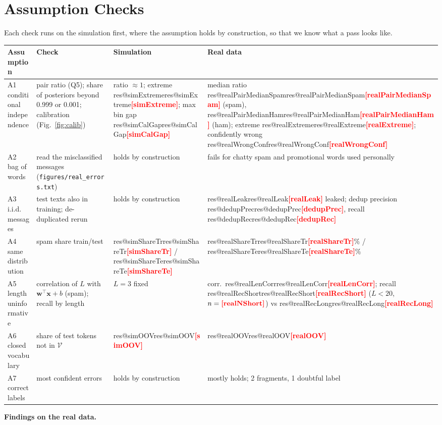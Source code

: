 \documentclass[11pt]{article}
\makeatletter
\newcommand{\fillin}[1]{\textcolor{red}{\textbf{[#1]}}}
\newcommand{\res}[1]{\ifcsname res@#1\endcsname\csname res@#1\endcsname\else\fillin{#1}\fi}
\theoremstyle{plain}
\newcommand{\V}{\mathcal{V}}
\newcommand{\bx}{\mathbf{x}}
\newcommand{\bw}{\mathbf{w}}
\makeatother
\begin{document}
\section{Assumption Checks}\label{sec:assump}
Each check runs on the simulation first, where the assumption holds by construction, so that we know
what a pass looks like.
\begin{center}
\small
\begin{tabularx}{\textwidth}{@{}>{\raggedright\arraybackslash}p{2.6cm}>{\raggedright\arraybackslash}X>{\raggedright\arraybackslash}p{2.5cm}>{\raggedright\arraybackslash}p{3.6cm}@{}}
\toprule
Assumption & Check & Simulation & Real data\\
\midrule
A1 conditional independence & pair ratio (Q5); share of posteriors beyond 0.999 or 0.001; calibration (Fig.~\ref{fig:calib}) & ratio $\approx1$; extreme \res{simExtreme}; max bin gap \res{simCalGap} & median ratio \res{realPairMedianSpam} (spam), \res{realPairMedianHam} (ham); extreme \res{realExtreme}; confidently wrong \res{realWrongConf}\\
A2 bag of words & read the misclassified messages (\texttt{figures/real\_errors.txt}) & holds by construction & fails for chatty spam and promotional words used personally\\
A3 i.i.d.\ messages & test texts also in training; de-duplicated rerun & holds by construction & \res{realLeak} leaked; dedup precision \res{dedupPrec}, recall \res{dedupRec}\\
A4 same distribution & spam share train/test & \res{simShareTr} / \res{simShareTe} & \res{realShareTr}\% / \res{realShareTe}\%\\
A5 length uninformative & correlation of $L$ with $\bw^\top\bx+b$ (spam); recall by length & $L=3$ fixed & corr.\ \res{realLenCorr}; recall \res{realRecShort} ($L<20$, $n=\res{realNShort}$) vs \res{realRecLong}\\
A6 closed vocabulary & share of test tokens not in $\V$ & \res{simOOV} & \res{realOOV}\\
A7 correct labels & most confident errors & holds by construction & mostly holds; 2 fragments, 1 doubtful label\\
\bottomrule
\end{tabularx}
\end{center}
\textbf{Findings on the real data.}
\end{document}
